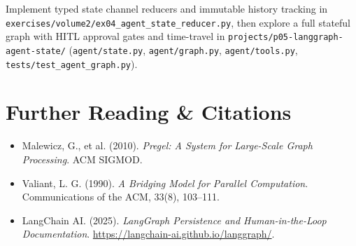 \begin{labbridgebox}
Implement typed state channel reducers and immutable history tracking in \texttt{exercises/volume2/ex04\_agent\_state\_reducer.py}, then explore a full stateful graph with HITL approval gates and time-travel in \texttt{projects/p05-langgraph-agent-state/} (\texttt{agent/state.py}, \texttt{agent/graph.py}, \texttt{agent/tools.py}, \texttt{tests/test\_agent\_graph.py}).
\end{labbridgebox}

\section{Further Reading \protect\& Citations}
\begin{itemize}[leftmargin=18pt]
  \item Malewicz, G., et al. (2010). \emph{Pregel: A System for Large-Scale Graph Processing}. ACM SIGMOD.
  \item Valiant, L. G. (1990). \emph{A Bridging Model for Parallel Computation}. Communications of the ACM, 33(8), 103--111.
  \item LangChain AI. (2025). \emph{LangGraph Persistence and Human-in-the-Loop Documentation}. \url{https://langchain-ai.github.io/langgraph/}.
\end{itemize}

